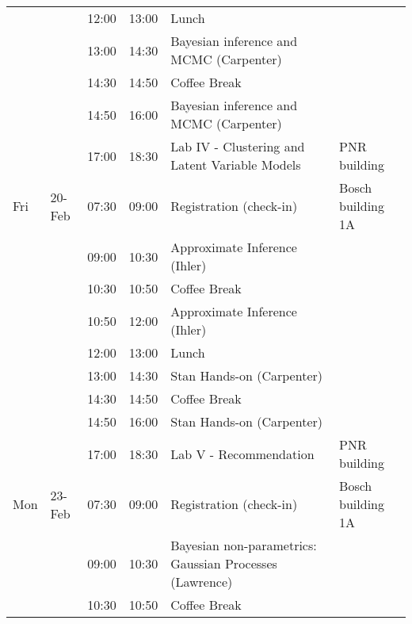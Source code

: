 \begin{table}[h]
\begin{tabular}{  l l l l p{7cm} l    }
    &        & 12:00 & 13:00 & Lunch                                                             &                   \\
    &        & 13:00 & 14:30 & Bayesian inference and MCMC (Carpenter)                           &                   \\
    &        & 14:30 & 14:50 & Coffee Break                                                      &                   \\
    &        & 14:50 & 16:00 & Bayesian inference and MCMC (Carpenter)                           &                   \\
    &        & 17:00 & 18:30 & Lab IV - Clustering and Latent Variable Models                    & PNR building      \\
Fri & 20-Feb & 07:30 & 09:00 & Registration (check-in)                                           & Bosch building 1A \\
    &        & 09:00 & 10:30 & Approximate Inference (Ihler)                                     &                   \\
    &        & 10:30 & 10:50 & Coffee Break                                                      &                   \\
    &        & 10:50 & 12:00 & Approximate Inference (Ihler)                                     &                   \\
    &        & 12:00 & 13:00 & Lunch                                                             &                   \\
    &        & 13:00 & 14:30 & Stan Hands-on (Carpenter)                                         &                   \\
    &        & 14:30 & 14:50 & Coffee Break                                                      &                   \\
    &        & 14:50 & 16:00 & Stan Hands-on (Carpenter)                                         &                   \\
    &        & 17:00 & 18:30 & Lab V - Recommendation                                            & PNR building      \\
Mon & 23-Feb & 07:30 & 09:00 & Registration (check-in)                                           & Bosch building 1A \\
    &        & 09:00 & 10:30 & Bayesian non-parametrics: Gaussian Processes (Lawrence)           &                   \\
    &        & 10:30 & 10:50 & Coffee Break                                                      &                   \\

\end{tabular}
\end{table}
